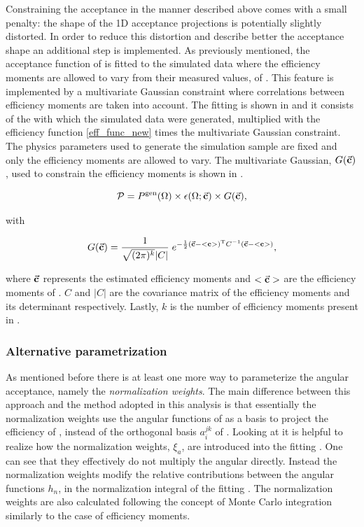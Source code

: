 Constraining the acceptance in the manner described above comes with a small penalty: the shape of the 1D acceptance
projections is potentially slightly distorted. In order to reduce this distortion and describe better the acceptance
shape an additional step is implemented. As previously mentioned, the acceptance function of  is
fitted to the simulated data where the efficiency moments are allowed to vary from their measured values, of .
This feature is implemented by a multivariate Gaussian constraint where correlations between efficiency moments are taken into account.
The fitting \pdf is shown in  and it consists of the \pdf with which the simulated
data were generated, multiplied with the efficiency function \eqref{eff_func_new} times the multivariate Gaussian constraint.
The physics parameters used to generate the simulation sample are fixed and only the efficiency moments are allowed to vary.
The multivariate Gaussian, $G(\vec{\bf{c}})$, used to constrain the efficiency moments is shown in .

\begin{equation}
  \centering
  \mathcal{P}= \Pgen \times\epsilon(\Omega;\vec{\bf c})  \times G(\vec{\bf{c}}),
  \label{mvm_constr}
\end{equation}

\noindent with

\begin{equation}
\centering
  G(\vec{\bf{c}}) = \frac{1}{\sqrt{(2\pi)^k}|C|} \; e^{-\frac{1}{2}(  \vec{\bf{c}} - <{\bf{c}}>  )^{\text{T}} C^{-1} (\vec{\bf{c}} - <{\bf{c}}> ) },
\label{mvm_constr_gauss}
\end{equation}

\noindent where $\vec{\bf c}$ represents the estimated efficiency moments and $<\vec{\bf c}>$ are the efficiency moments
of . $C$ and $|C|$ are the covariance matrix of the efficiency moments and its determinant respectively.
Lastly, $k$ is the number of efficiency moments present in .

\subsubsection{Alternative parametrization}
As mentioned before there is at least one more way to parameterize the angular acceptance, namely the \emph{normalization weights}.
The main difference between this approach and the method adopted in this analysis is that essentially the normalization weights use the angular functions
of  as a basis to project the efficiency of , instead of the orthogonal basis $a_i^{jk}$ of .
Looking at  it is helpful to realize how the normalization weights, $\xi_a$, are introduced into the fitting \pdf.
One can see that they effectively do not multiply the angular \pdf directly. Instead the normalization weights modify the relative contributions
between the angular functions $h_n$, in the normalization integral of the fitting \pdf. The normalization weights are also calculated following the concept of Monte Carlo integration
similarly to the case of efficiency moments.

